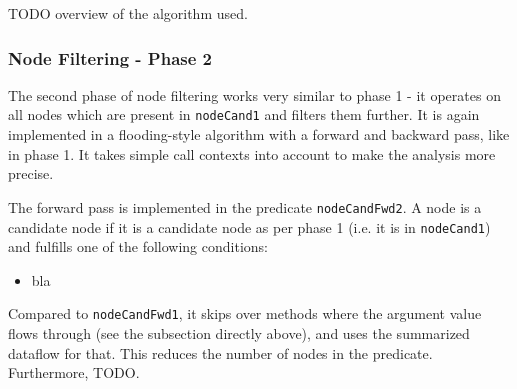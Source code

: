 TODO overview of the algorithm used.

\subsubsection*{Node Filtering - Phase 2}
The second phase of node filtering works very similar to phase 1 - it 
operates on all nodes which are present in \texttt{nodeCand1} and filters them further.
It is again implemented in a flooding-style algorithm with a forward and backward 
pass, like in phase 1.
It takes simple call contexts into account to make the analysis more precise.

The forward pass is implemented in the predicate \texttt{nodeCandFwd2}.
A node is a candidate node if it is a candidate node as per phase 1 (i.e. it is in \texttt{nodeCand1})
and fulfills one of the following conditions:
\begin{itemize}
    \item bla
\end{itemize}
Compared to \texttt{nodeCandFwd1}, it skips over methods where the argument value 
flows through (see the subsection directly above), and uses the summarized dataflow for that.
This reduces the number of nodes in the predicate.
Furthermore, TODO.%








